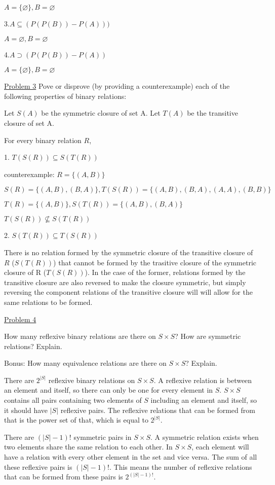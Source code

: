 \documentclass{article}
\begin{document}
$A = \{\varnothing\}, B = \varnothing$\newline

3.$A \subseteq (P(P(B)) - P(A)))$

$A = \varnothing, B = \varnothing$\newline

4.$A \supset (P(P(B)) - P(A))$

$A = \{\varnothing\}, B = \varnothing$\newline

\underline{Problem 3}
Pove or disprove (by providing a counterexample) each of the following properties of binary relations:

Let $S(A)$ be the symmetric closure of set A. Let $T(A)$ be the transitive closure of set A.

For every binary relation $R$,

1. $T(S(R)) \subseteq S(T(R))$

counterexample: $R = \{(A,B)\}$ 

$S(R) = \{(A,B),(B,A)\}, T(S(R)) = \{(A,B),(B,A),(A,A),(B,B)\}$

$T(R) = \{(A,B)\}, S(T(R)) = \{(A,B),(B,A)\}$

$T(S(R)) \not\subseteq S(T(R))$\newline

2. $S(T(R)) \subseteq T(S(R))$

There is no relation formed by the symmetric closure of the transitive closure of $R$ ($S(T(R))$) that cannot be formed by the trasitive closure of the symmetric closure of R ($T(S(R))$). In the case of the former, relations formed by the transitive closure are also reversed to make the closure symmetric, but simply reversing the component relations of the transitive closure will will allow for the same relations to be formed.\newline

\underline{Problem 4}

How many reflexive binary relations are there on $S \times S$? How are symmetric relations? Explain.

Bonus: How many equivalence relations are there on $S \times S$? Explain.

There are $2^{|S|}$ reflexive binary relations on $S \times S$. A reflexive relation is between an element and itself, so there can only be one for every element in $S$. $S \times S$ contains all pairs containing two elements of $S$ including an element and itself, so it should have $|S|$ reflexive pairs. The reflexive relations that can be formed from that is the power set of that, which is equal to $2^{|S|}$.

There are $(|S|-1)!$ symmetric pairs in $S \times S$. A symmetric relation exists when two elements share the same relation to each other. In $S \times S$, each element will have a relation with every other element in the set and vice versa. The sum of all these reflexive pairs is $(|S| - 1)!$. This means the number of reflexive relations that can be formed from these pairs is $2^{(|S|-1)!}$.
\end{document}
